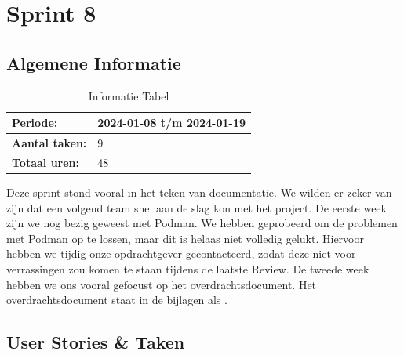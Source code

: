 \documentclass[a4paper]{report}
\begin{document}
  
\chapter{Sprint 8}
\section{Algemene Informatie}
\begin{table}[H]
\begin{tabularx}{0.6\textwidth}{|X|X|}
  \hline
  \cellcolor[HTML]{99ccff} \textbf{Periode:} & 2024-01-08 t/m 2024-01-19 \\ 
  \hline
  \cellcolor[HTML]{99ccff} \textbf{Aantal taken:} & 9 \\ 
  \hline
  \cellcolor[HTML]{99ccff} \textbf{Totaal uren:} & 48 \\ 
  \hline
\end{tabularx}
\caption{Informatie Tabel}
\label{table:it8:general}
\end{table}
Deze sprint stond vooral in het teken van documentatie. We wilden er zeker van zijn dat een volgend team snel aan de slag kon met het project. 
De eerste week zijn we nog bezig geweest met Podman. We hebben geprobeerd om de problemen met Podman op te lossen, maar dit is helaas niet volledig gelukt.
Hiervoor hebben we tijdig onze opdrachtgever gecontacteerd, zodat deze niet voor verrassingen zou komen te staan tijdens de laatste Review. 
De tweede week hebben we ons vooral gefocust op het overdrachtsdocument.
Het overdrachtsdocument staat in de bijlagen als .

\section{User Stories \& Taken}
\end{document}
